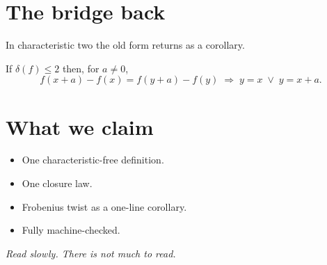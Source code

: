 \documentclass[11pt]{article}
\begin{document}
\bigskip


\newpage


\section{The bridge back}

\bigskip

In characteristic two the old form returns as a corollary.

\bigskip

\begin{theorem}
If $\delta(f) \le 2$ then, for $a \neq 0$,
\[
  f(x+a) - f(x) = f(y+a) - f(y)
  \;\Longrightarrow\;
  y = x \;\vee\; y = x + a.
\]
\end{theorem}

\bigskip


\newpage


\section{What we claim}

\bigskip

\begin{itemize}
  \item One characteristic-free definition.\\[6pt]
  \item One closure law.\\[6pt]
  \item Frobenius twist as a one-line corollary.\\[6pt]
  \item Fully machine-checked.
\end{itemize}

\vfill

\noindent\textit{Read slowly. There is not much to read.}
\end{document}
